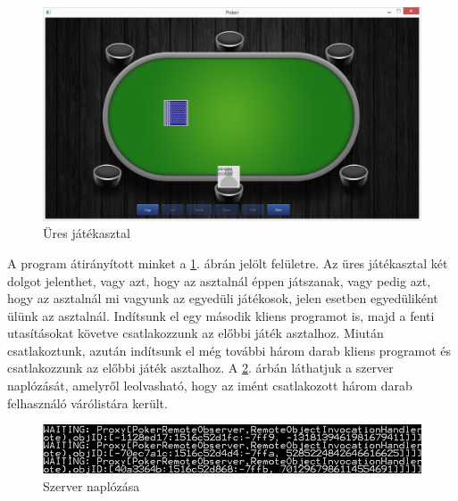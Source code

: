 \begin{figure}[h!]
  \caption{Üres játékasztal}
  \label{fig:parti_1}
  \centering
    \includegraphics[width=\linewidth]{user-documentation/images/parti/parti_1.jpg}
\end{figure}
A program átirányított minket a \ref{fig:parti_1}. ábrán jelölt felületre. Az üres játékasztal két dolgot jelenthet, vagy azt, hogy az asztalnál éppen játszanak, vagy pedig azt, hogy az asztalnál mi vagyunk az egyedüli játékosok, jelen esetben egyedüliként ülünk az asztalnál. Indítsunk el egy második kliens programot is, majd a fenti utasításokat követve csatlakozzunk az előbbi játék asztalhoz. Miután csatlakoztunk, azután indítsunk el még további három darab kliens programot és csatlakozzunk az előbbi játék asztalhoz. A \ref{fig:sv_log}. árbán láthatjuk a szerver naplózását, amelyről leolvasható, hogy az imént csatlakozott három darab felhasználó várólistára került. \\
\begin{figure}[h!]
  \caption{Szerver naplózása}
  \label{fig:sv_log}
  \centering
    \includegraphics[width=\linewidth]{user-documentation/images/sv_log.jpg}
\end{figure}

